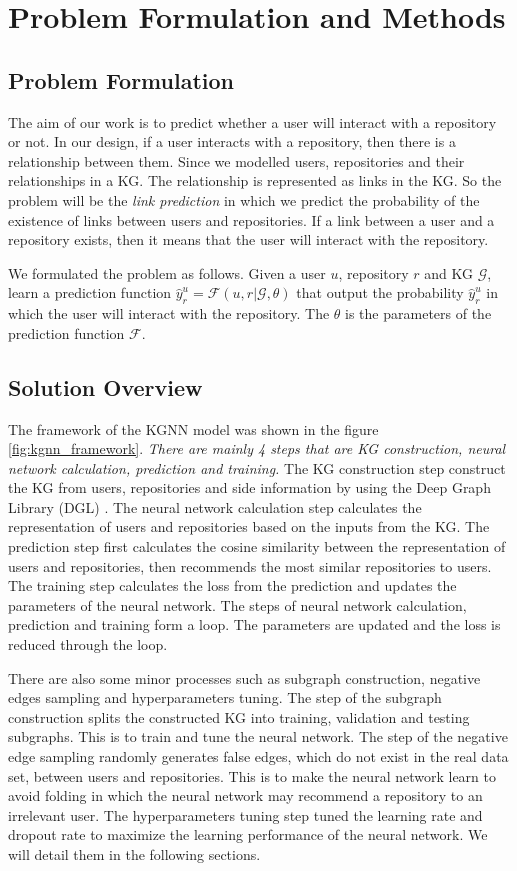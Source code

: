 \documentclass[11pt,twoside]{report}
\begin{document}
\chapter{Problem Formulation and Methods}
\section{Problem Formulation}
The aim of our work is to predict whether a user will interact with a repository or not. In our design, if a user interacts with a repository, then there is a relationship between them. Since we modelled users, repositories and their relationships in a KG. The relationship is represented as links in the KG. So the problem will be the \textit{link prediction} in which we predict the probability of the existence of links between users and repositories. If a link between a user and a repository exists, then it means that the user will interact with the repository.

We formulated the problem as follows. Given a user $u$, repository $r$ and KG $\mathcal{G}$, learn a prediction function $\hat{y}_r^u=\mathcal{F}(u,r|\mathcal{G},\theta)$ that output the probability $\hat{y}_r^u$ in which the user will interact with the repository. The $\theta$ is the parameters of the prediction function $\mathcal{F}$.

\section{Solution Overview}
The framework of the KGNN model was shown in the figure \ref{fig:kgnn_framework}. \textit{There are mainly 4 steps that are KG construction, neural network calculation, prediction and training.} The KG construction step construct the KG from users, repositories and side information by using the Deep Graph Library (DGL) \cite{wang2019dgl}. The neural network calculation step calculates the representation of users and repositories based on the inputs from the KG. The prediction step first calculates the cosine similarity between the representation of users and repositories, then recommends the most similar repositories to users. The training step calculates the loss from the prediction and updates the parameters of the neural network. The steps of neural network calculation, prediction and training form a loop. The parameters are updated and the loss is reduced through the loop.

There are also some minor processes such as subgraph construction, negative edges sampling and hyperparameters tuning. The step of the subgraph construction splits the constructed KG into training, validation and testing subgraphs. This is to train and tune the neural network. The step of the negative edge sampling randomly generates false edges, which do not exist in the real data set, between users and repositories. This is to make the neural network learn to avoid folding \cite{xin_folding_2017} in which the neural network may recommend a repository to an irrelevant user. The hyperparameters tuning step tuned the learning rate and dropout rate to maximize the learning performance of the neural network. We will detail them in the following sections.
\end{document}
